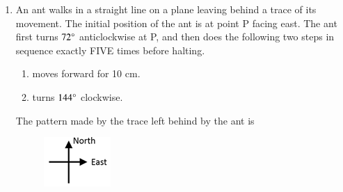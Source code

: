 \documentclass[journal,12pt,onecolumn]{IEEEtran}
\theoremstyle{remark}
\begin{document}
\begin{enumerate}
    \item An ant walks in a straight line on a plane leaving behind a trace of its movement. The initial position of the ant is at point P facing east. The ant first turns $72\degree$ anticlockwise at P, and then does the following two steps in sequence exactly FIVE times before halting.
    \begin{enumerate}
        \item moves forward for 10 cm.
        \item turns $144\degree$ clockwise.
    \end{enumerate}
    The pattern made by the trace left behind by the ant is
    \begin{figure}[H]
        \centering
        \includegraphics[width=0.2\linewidth]{fig6.png}
        \caption{}
        \label{fig:placeholder}
    \end{figure}


\end{enumerate}
\end{document}
